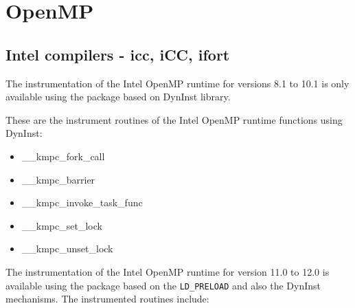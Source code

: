 
\section{OpenMP}\label{sec:OpenMPruntimesinstrumented}

\subsection{Intel compilers - icc, iCC, ifort}

The instrumentation of the Intel OpenMP runtime for versions 8.1 to 10.1 is only available using the \TRACE package based on DynInst library.

These are the instrument routines of the Intel OpenMP runtime functions using DynInst:

\begin{itemize}
\item \_\_kmpc\_fork\_call
\item \_\_kmpc\_barrier
\item \_\_kmpc\_invoke\_task\_func
\item \_\_kmpc\_set\_lock\footnotemark[4]
\item \_\_kmpc\_unset\_lock\footnotemark[4]
\end{itemize}

The instrumentation of the Intel OpenMP runtime for version 11.0 to 12.0 is available using the \TRACE package based on the {\tt LD\_PRELOAD} and also the DynInst mechanisms. The instrumented routines include:

